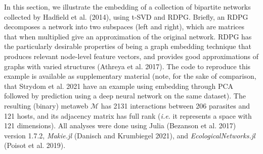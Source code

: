 \documentclass[
  letterpaper,
  DIV=11,
  numbers=noendperiod]{scrartcl}
\begin{document}
In this section, we illustrate the embedding of a collection of
bipartite networks collected by Hadfield et al. (2014), using t-SVD and
RDPG. Briefly, an RDPG decomposes a network into two subspaces (left and
right), which are matrices that when multiplied give an approximation of
the original network. RDPG has the particularly desirable properties of
being a graph embedding technique that produces relevant node-level
feature vectors, and provides good approximations of graphs with varied
structures (Athreya et al. 2017). The code to reproduce this example is
available as supplementary material (note, for the sake of comparison,
that Strydom et al. 2021 have an example using embedding through PCA
followed by prediction using a deep neural network on the same dataset).
The resulting (binary) metaweb \(\mathcal{M}\) has 2131 interactions
between 206 parasites and 121 hosts, and its adjacency matrix has full
rank (\emph{i.e.} it represents a space with 121 dimensions). All
analyses were done using Julia (Bezanson et al. 2017) version 1.7.2,
\emph{Makie.jl} (Danisch and Krumbiegel 2021), and
\emph{EcologicalNetworks.jl} (Poisot et al. 2019).
\end{document}
